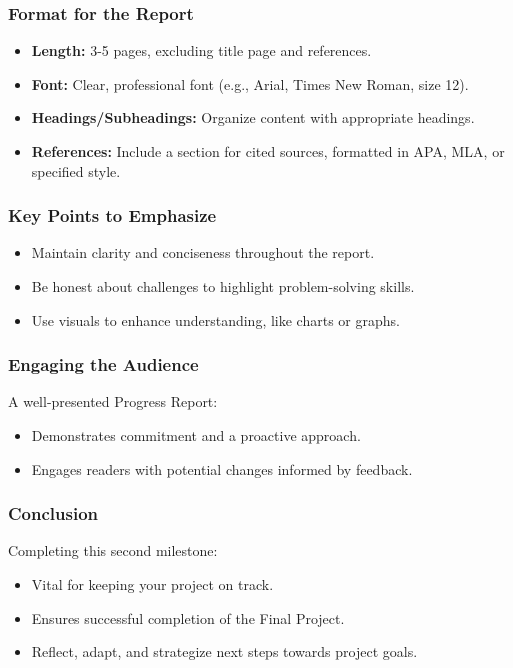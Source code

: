 \documentclass{beamer}
\begin{document}
\begin{frame}[fragile]
    \frametitle{Format for the Report}
    \begin{itemize}
        \item \textbf{Length:} 3-5 pages, excluding title page and references.
        \item \textbf{Font:} Clear, professional font (e.g., Arial, Times New Roman, size 12).
        \item \textbf{Headings/Subheadings:} Organize content with appropriate headings.
        \item \textbf{References:} Include a section for cited sources, formatted in APA, MLA, or specified style.
    \end{itemize}
\end{frame}

\begin{frame}[fragile]
    \frametitle{Key Points to Emphasize}
    \begin{itemize}
        \item Maintain clarity and conciseness throughout the report.
        \item Be honest about challenges to highlight problem-solving skills.
        \item Use visuals to enhance understanding, like charts or graphs.
    \end{itemize}
\end{frame}

\begin{frame}[fragile]
    \frametitle{Engaging the Audience}
    A well-presented Progress Report:
    \begin{itemize}
        \item Demonstrates commitment and a proactive approach.
        \item Engages readers with potential changes informed by feedback.
    \end{itemize}
\end{frame}

\begin{frame}[fragile]
    \frametitle{Conclusion}
    Completing this second milestone:
    \begin{itemize}
        \item Vital for keeping your project on track.
        \item Ensures successful completion of the Final Project.
        \item Reflect, adapt, and strategize next steps towards project goals.
    \end{itemize}
\end{frame}
\end{document}
